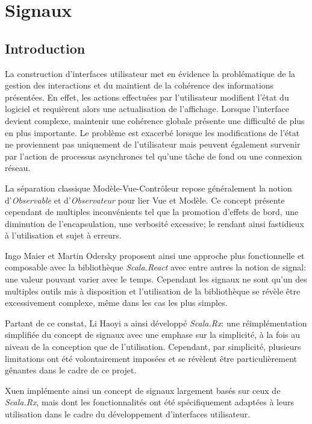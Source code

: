 \chapter{Signaux}

\section{Introduction}

	La construction d'interfaces utilisateur met en évidence la problématique de la gestion des interactions et du maintient de la cohérence des informations présentées. En effet, les actions effectuées par l'utilisateur modifient l'état du logiciel et requièrent alors une actualisation de l'affichage. Lorsque l'interface devient complexe, maintenir une cohérence globale présente une difficulté de plus en plus importante. Le problème est exacerbé lorsque les modifications de l'état ne proviennent pas uniquement de l'utilisateur mais peuvent également survenir par l'action de processus asynchrones tel qu'une tâche de fond ou une connexion réseau.
	
	La séparation classique Modèle-Vue-Contrôleur repose généralement la notion d'\emph{Observable} et d'\emph{Observateur} pour lier Vue et Modèle. Ce concept présente cependant de multiples inconvénients tel que la promotion d'effets de bord, une diminution de l'encapsulation, une verbosité excessive; le rendant ainsi fastidieux à l'utilisation et sujet à erreurs\cite{odersky2012}.
	
	Ingo Maier et Martin Odersky proposent ainsi une approche plus fonctionnelle et composable avec la bibliothèque \emph{Scala.React}\cite{scala-react} avec entre autres la notion de signal: une valeur pouvant varier avec le temps. Cependant les signaux ne sont qu'un des multiples outils mis à disposition et l'utilisation de la bibliothèque se révèle être excessivement complexe, même dans les cas les plus simples\cite[\small Related~Work]{scala.rx}.
	
	Partant de ce constat, Li Haoyi a ainsi développé \emph{Scala.Rx}\cite{scala.rx}: une réimplémentation simplifiée du concept de signaux avec une emphase sur la simplicité, à la fois au niveau de la conception que de l'utilisation. Cependant, par simplicité, plusieurs limitations ont été volontairement imposées et se révèlent être particulièrement gênantes dans le cadre de ce projet.
	
	Xuen implémente ainsi un concept de signaux largement basés sur ceux de \emph{Scala.Rx}, mais dont les fonctionnalités ont été spécifiquement adaptées à leurs utilisation dans le cadre du développement d'interfaces utilisateur.

